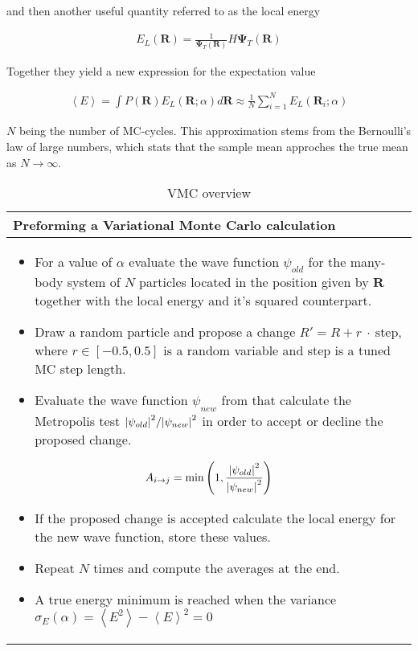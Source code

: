 and then another useful quantity referred to as the local energy

\begin{align}
    E_L(\mathbf{R}) = \frac{1}{\mathbf{\Psi}_T (\mathbf{R})}H \mathbf{\Psi}_T (\mathbf{R})
\end{align}

Together they yield a new expression for the expectation value

\begin{align}
    \left\langle E \right\rangle = \int P(\mathbf{R}) E_L (\mathbf{R}; \alpha) d\mathbf{R} \approx \frac{1}{N} \sum_{i=1}^N E_L(\mathbf{R}_i; \alpha)
\end{align}

$N$ being the number of MC-cycles. This approximation stems from the Bernoulli's law of large numbers, which stats that the sample mean approches the true mean as $N \rightarrow \infty$.

\begin{table}[h!]
    \centering
    \begin{tabular}{|p{}|}
        \hline Preforming a Variational Monte Carlo calculation \\ \hline
        \begin{itemize}
            \item For a value of $\alpha$ evaluate the wave function $\psi_{old}$ for the many-body system of $N$ particles located in the position given by $\mathbf{R}$ together with the local energy and it's squared counterpart.
            \item Draw a random particle and propose a change $R' = R + r\ \cdot\ \text{step}$, where $r \in [ -0.5, 0.5 ]$ is a random variable and step is a tuned MC step length.
            \item Evaluate the wave function $\psi_{new}$ from that calculate the Metropolis test $\abs{\psi_{old}}^2/\abs{\psi_{new}}^2$ in order to accept or decline the proposed change.
        \end{itemize}
        $$A_{i \rightarrow j} = \text{min}\left( 1, \frac{\abs{\psi_{old}}^2}{\abs{\psi_{new}}^2} \right)$$
        \begin{itemize}
            \item If the proposed change is accepted calculate the local energy for the new wave function, store these values.
            \item Repeat $N$ times and compute the averages at the end.
            \item A true energy minimum is reached when the variance $\sigma_E(\alpha) = \left\langle E^2 \right\rangle - \left\langle E \right\rangle^2 = 0$
        \end{itemize} \\ \hline
    \end{tabular}
    \caption{VMC overview}
    \label{tab:VMC}
\end{table}

